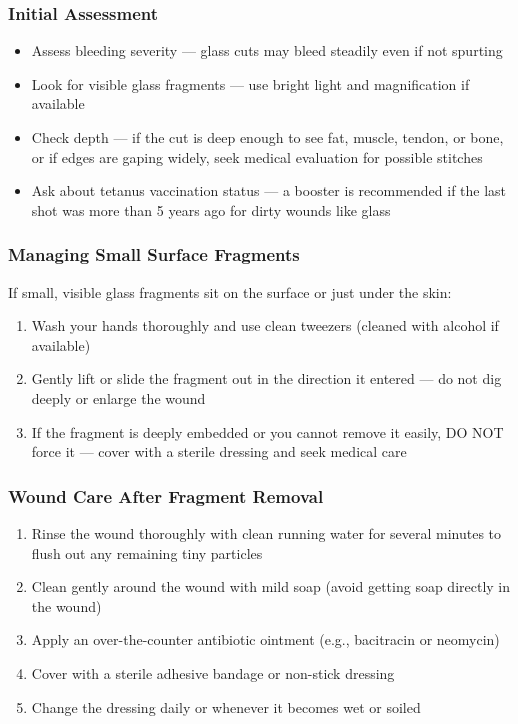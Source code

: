 \subsubsection{Initial Assessment}

\begin{itemize}[leftmargin=*]
  \item Assess bleeding severity — glass cuts may bleed steadily even if not spurting
  \item Look for visible glass fragments — use bright light and magnification if available
  \item Check depth — if the cut is deep enough to see fat, muscle, tendon, or bone, or if edges are gaping widely, seek medical evaluation for possible stitches
  \item Ask about tetanus vaccination status — a booster is recommended if the last shot was more than 5 years ago for dirty wounds like glass
\end{itemize}

\subsubsection{Managing Small Surface Fragments}

If small, visible glass fragments sit on the surface or just under the skin:

\begin{enumerate}[leftmargin=*]
  \item Wash your hands thoroughly and use clean tweezers (cleaned with alcohol if available)
  \item Gently lift or slide the fragment out in the direction it entered — do not dig deeply or enlarge the wound
  \item If the fragment is deeply embedded or you cannot remove it easily, DO NOT force it — cover with a sterile dressing and seek medical care
\end{enumerate}
\subsubsection{Wound Care After Fragment Removal}

\begin{enumerate}[leftmargin=*]
  \item Rinse the wound thoroughly with clean running water for several minutes to flush out any remaining tiny particles
  \item Clean gently around the wound with mild soap (avoid getting soap directly in the wound)
  \item Apply an over-the-counter antibiotic ointment (e.g., bacitracin or neomycin)
  \item Cover with a sterile adhesive bandage or non-stick dressing
  \item Change the dressing daily or whenever it becomes wet or soiled
\end{enumerate}
